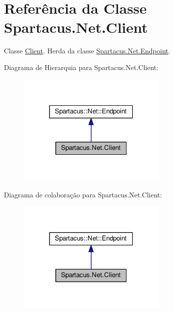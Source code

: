 \hypertarget{classSpartacus_1_1Net_1_1Client}{\section{Referência da Classe Spartacus.\+Net.\+Client}
\label{classSpartacus_1_1Net_1_1Client}
}


Classe \hyperlink{classSpartacus_1_1Net_1_1Client}{Client}. Herda da classe \hyperlink{classSpartacus_1_1Net_1_1Endpoint}{Spartacus.\+Net.\+Endpoint}.  




Diagrama de Hierarquia para Spartacus.\+Net.\+Client\+:
\nopagebreak
\begin{figure}[H]
\begin{center}
\leavevmode
\includegraphics[width=207pt]{classSpartacus_1_1Net_1_1Client__inherit__graph}
\end{center}
\end{figure}


Diagrama de colaboração para Spartacus.\+Net.\+Client\+:
\nopagebreak
\begin{figure}[H]
\begin{center}
\leavevmode
\includegraphics[width=207pt]{classSpartacus_1_1Net_1_1Client__coll__graph}
\end{center}
\end{figure}
